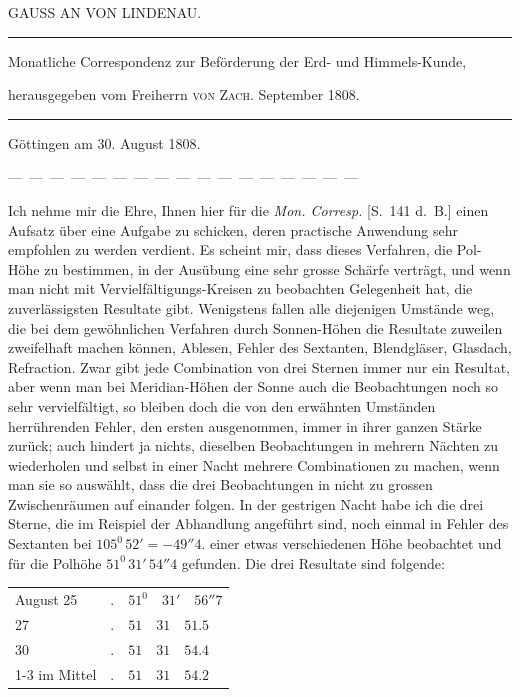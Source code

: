 \clearpage{}%
\begin{center}
{\small GAUSS AN VON LINDENAU.\par}
\medskip\hrule\medskip
{\small Monatliche Correspondenz zur Beförderung der Erd- und Himmels-Kunde,\par
herausgegeben vom Freiherrn \textsc{von Zach}. September 1808.\par}
\medskip\hrule
\end{center}\medskip
\begin{flushright}Göttingen am 30. August 1808.\end{flushright}
\begin{center}\small
—\ —\ —\ —\ —\ —\ —\ —\ —\ —\ —\ —\ —\ —\ —\ —\ —
\end{center}
Ich nehme mir die Ehre, Ihnen hier für die \emph{Mon. Corresp.} [S.\ 141 d.\ B.] einen Aufsatz über eine Aufgabe zu schicken, deren practische Anwendung sehr empfohlen zu werden verdient. Es scheint mir, dass dieses Verfahren, die Pol-Höhe zu bestimmen, in der Ausübung eine sehr grosse Schärfe verträgt, und wenn man nicht mit Vervielfältigungs-Kreisen zu beobachten Gelegenheit hat, die zuverlässigsten Resultate gibt. Wenigstens fallen alle diejenigen Umstände weg, die bei dem gewöhnlichen Verfahren durch Sonnen-Höhen die Resultate zuweilen zweifelhaft machen können, Ablesen, Fehler des Sextanten, Blendgläser, Glasdach, Refraction. Zwar gibt jede Combination von drei Sternen immer nur ein Resultat, aber wenn man bei Meridian-Höhen der Sonne auch die Beobachtungen noch so sehr vervielfältigt, so bleiben doch die von den erwähnten Umständen herrührenden Fehler, den ersten ausgenommen, immer in ihrer ganzen Stärke zurück; auch hindert ja nichts, dieselben Beobachtungen in mehrern Nächten zu wiederholen und selbst in einer Nacht mehrere Combinationen zu machen, wenn man sie so auswählt, dass die drei Beobachtungen in nicht zu grossen Zwischenräumen auf einander folgen. In der gestrigen Nacht habe ich die drei Sterne, die im Reispiel der Abhandlung angeführt sind, noch einmal in
%
\expandafter\def\csname HistoricalNoteText7\endcsname{Fehler des Sextanten bei $105^0\,52'= -49''4$.}%
einer etwas verschiedenen Höhe beobachtet und für die Polhöhe $51^0\,31'\,54''4$ gefunden. Die drei Resultate sind folgende:
\begin{center}
\begin{tabular}{lr@{\quad}l}
August 25 & $.$ & $51^0\quad31'\quad56''7$\\
27 & $.$ & $51\quad31\quad51.5$\\
30 & $.$ & $51\quad31\quad54.4$\\\cline{1-3}
im Mittel & $.$ & $51\quad31\quad54.2$
\end{tabular}
\end{center}
